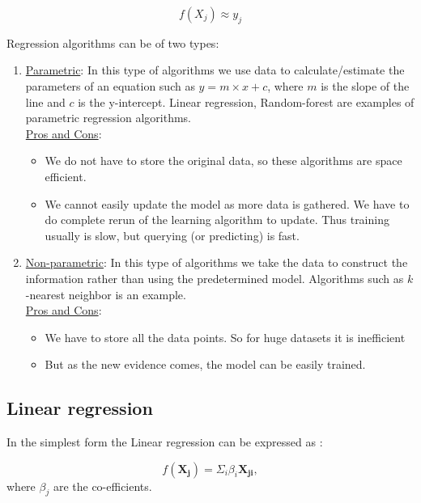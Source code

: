 \documentclass[12pt]{article}
\begin{document}
\begin{itemize}
\[ f(X_j) \approx y_j \]

Regression algorithms can be of two types:
\begin{enumerate}
\item \underline{Parametric}: In this type of algorithms we use data to calculate/estimate the parameters of an equation such as $y=m\times x +c$, where $m$ is the slope of the line and $c$ is the y-intercept. Linear regression, Random-forest are examples of parametric regression algorithms.
\\
\underline{Pros and Cons}:
\begin{itemize}
\item We do not have to store the original data, so these algorithms are space efficient.
\item We cannot easily update the model as more data is gathered. We have to do complete rerun of the learning algorithm to update. Thus training usually is slow, but querying (or predicting) is fast.
\end{itemize}
\item \underline{Non-parametric}: In this type of algorithms we take the data to construct the information rather than using the predetermined model. Algorithms such as $k$-nearest neighbor is an example.
\\
\underline{Pros and Cons}:
\begin{itemize}
\item We have to store all the data points. So for huge datasets it is inefficient
\item But as the new evidence comes, the model can be easily trained. 
\end{itemize}
\end{enumerate}


\subsection{Linear regression}
\label{sec:lr}
In the simplest form the Linear regression can be expressed as :

\begin{equation}
\label{eq:lr}
f(\mathbf{X_j})=\Sigma_i\beta_i \mathbf{X_{ji}},
\end{equation}
where $\beta_j$ are the co-efficients.


\end{itemize}
\end{document}

